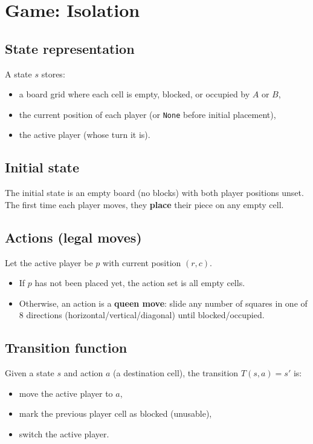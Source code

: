 \documentclass[11pt]{article}
\begin{document}
\section{Game: Isolation}
\subsection{State representation}
A state \(s\) stores:
\begin{itemize}
  \item a board grid where each cell is empty, blocked, or occupied by \(A\) or \(B\),
  \item the current position of each player (or \texttt{None} before initial placement),
  \item the active player (whose turn it is).
\end{itemize}

\subsection{Initial state}
The initial state is an empty board (no blocks) with both player positions unset. The first time each player moves,
they \textbf{place} their piece on any empty cell.

\subsection{Actions (legal moves)}
Let the active player be \(p\) with current position \((r,c)\).
\begin{itemize}
  \item If \(p\) has not been placed yet, the action set is all empty cells.
  \item Otherwise, an action is a \textbf{queen move}: slide any number of squares in one of 8 directions
  (horizontal/vertical/diagonal) until blocked/occupied.
\end{itemize}

\subsection{Transition function}
Given a state \(s\) and action \(a\) (a destination cell), the transition \(T(s,a)=s'\) is:
\begin{itemize}
  \item move the active player to \(a\),
  \item mark the previous player cell as blocked (unusable),
  \item switch the active player.
\end{itemize}
\end{document}
